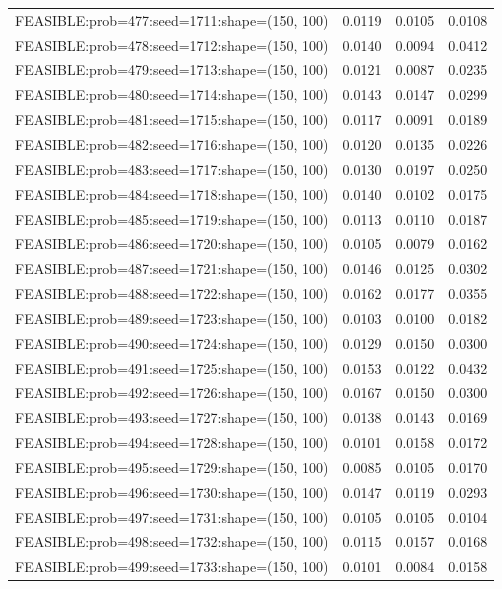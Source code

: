 \begin{longtable}{lccc}
FEASIBLE:prob=477:seed=1711:shape=(150, 100) &   0.0119 & 0.0105 & 0.0108 \\
FEASIBLE:prob=478:seed=1712:shape=(150, 100) &   0.0140 & 0.0094 & 0.0412 \\
FEASIBLE:prob=479:seed=1713:shape=(150, 100) &   0.0121 & 0.0087 & 0.0235 \\
FEASIBLE:prob=480:seed=1714:shape=(150, 100) &   0.0143 & 0.0147 & 0.0299 \\
FEASIBLE:prob=481:seed=1715:shape=(150, 100) &   0.0117 & 0.0091 & 0.0189 \\
FEASIBLE:prob=482:seed=1716:shape=(150, 100) &   0.0120 & 0.0135 & 0.0226 \\
FEASIBLE:prob=483:seed=1717:shape=(150, 100) &   0.0130 & 0.0197 & 0.0250 \\
FEASIBLE:prob=484:seed=1718:shape=(150, 100) &   0.0140 & 0.0102 & 0.0175 \\
FEASIBLE:prob=485:seed=1719:shape=(150, 100) &   0.0113 & 0.0110 & 0.0187 \\
FEASIBLE:prob=486:seed=1720:shape=(150, 100) &   0.0105 & 0.0079 & 0.0162 \\
FEASIBLE:prob=487:seed=1721:shape=(150, 100) &   0.0146 & 0.0125 & 0.0302 \\
FEASIBLE:prob=488:seed=1722:shape=(150, 100) &   0.0162 & 0.0177 & 0.0355 \\
FEASIBLE:prob=489:seed=1723:shape=(150, 100) &   0.0103 & 0.0100 & 0.0182 \\
FEASIBLE:prob=490:seed=1724:shape=(150, 100) &   0.0129 & 0.0150 & 0.0300 \\
FEASIBLE:prob=491:seed=1725:shape=(150, 100) &   0.0153 & 0.0122 & 0.0432 \\
FEASIBLE:prob=492:seed=1726:shape=(150, 100) &   0.0167 & 0.0150 & 0.0300 \\
FEASIBLE:prob=493:seed=1727:shape=(150, 100) &   0.0138 & 0.0143 & 0.0169 \\
FEASIBLE:prob=494:seed=1728:shape=(150, 100) &   0.0101 & 0.0158 & 0.0172 \\
FEASIBLE:prob=495:seed=1729:shape=(150, 100) &   0.0085 & 0.0105 & 0.0170 \\
FEASIBLE:prob=496:seed=1730:shape=(150, 100) &   0.0147 & 0.0119 & 0.0293 \\
FEASIBLE:prob=497:seed=1731:shape=(150, 100) &   0.0105 & 0.0105 & 0.0104 \\
FEASIBLE:prob=498:seed=1732:shape=(150, 100) &   0.0115 & 0.0157 & 0.0168 \\
FEASIBLE:prob=499:seed=1733:shape=(150, 100) &   0.0101 & 0.0084 & 0.0158 \\

\end{longtable}
